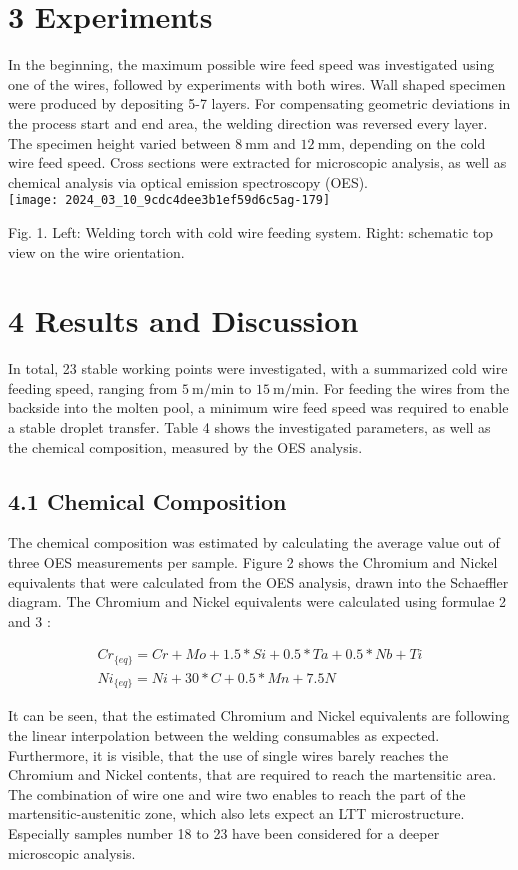 \documentclass[10pt]{article}
\begin{document}
\section*{3 Experiments}
In the beginning, the maximum possible wire feed speed was investigated using one of the wires, followed by experiments with both wires. Wall shaped specimen were produced by depositing 5-7 layers. For compensating geometric deviations in the process start and end area, the welding direction was reversed every layer. The specimen height varied between $8 \mathrm{~mm}$ and $12 \mathrm{~mm}$, depending on the cold wire feed speed. Cross sections were extracted for microscopic analysis, as well as chemical analysis via optical emission spectroscopy (OES).\\
\texttt{[image: 2024\_03\_10\_9cdc4dee3b1ef59d6c5ag-179]}

Fig. 1. Left: Welding torch with cold wire feeding system. Right: schematic top view on the wire orientation.

\section*{4 Results and Discussion}
In total, 23 stable working points were investigated, with a summarized cold wire feeding speed, ranging from $5 \mathrm{~m} / \mathrm{min}$ to $15 \mathrm{~m} / \mathrm{min}$. For feeding the wires from the backside into the molten pool, a minimum wire feed speed was required to enable a stable droplet transfer. Table 4 shows the investigated parameters, as well as the chemical composition, measured by the OES analysis.

\subsection*{4.1 Chemical Composition}
The chemical composition was estimated by calculating the average value out of three OES measurements per sample. Figure 2 shows the Chromium and Nickel equivalents that were calculated from the OES analysis, drawn into the Schaeffler diagram. The Chromium and Nickel equivalents were calculated using formulae 2 and 3 :


\begin{gather*}
C r_{\{e q\}}=C r+M o+1.5 * S i+0.5 * T a+0.5 * N b+T i  \tag{2}\\
N i_{\{e q\}}=N i+30 * C+0.5 * M n+7.5 N \tag{3}
\end{gather*}


It can be seen, that the estimated Chromium and Nickel equivalents are following the linear interpolation between the welding consumables as expected. Furthermore, it is visible, that the use of single wires barely reaches the Chromium and Nickel contents, that are required to reach the martensitic area. The combination of wire one and wire two enables to reach the part of the martensitic-austenitic zone, which also lets expect an LTT microstructure. Especially samples number 18 to 23 have been considered for a deeper microscopic analysis.
\end{document}
